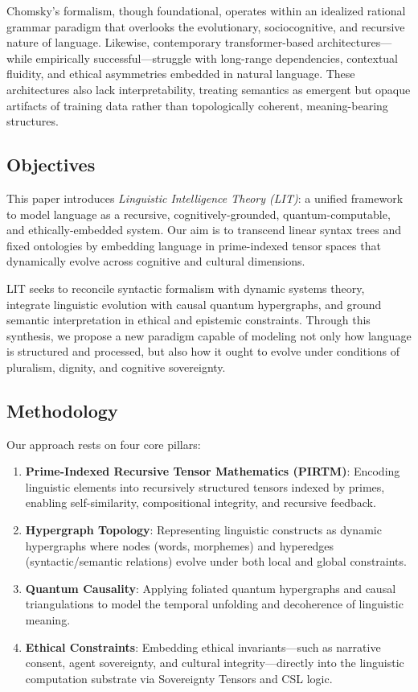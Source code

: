 \documentclass{article}
\theoremstyle{plain}
\theoremstyle{claimstyle}
\begin{document}
Chomsky’s formalism, though foundational, operates within an idealized rational grammar paradigm that overlooks the evolutionary, sociocognitive, and recursive nature of language. Likewise, contemporary transformer-based architectures—while empirically successful—struggle with long-range dependencies, contextual fluidity, and ethical asymmetries embedded in natural language. These architectures also lack interpretability, treating semantics as emergent but opaque artifacts of training data rather than topologically coherent, meaning-bearing structures.

\subsection{Objectives}

This paper introduces \textit{Linguistic Intelligence Theory (LIT)}: a unified framework to model language as a recursive, cognitively-grounded, quantum-computable, and ethically-embedded system. Our aim is to transcend linear syntax trees and fixed ontologies by embedding language in prime-indexed tensor spaces that dynamically evolve across cognitive and cultural dimensions. 

LIT seeks to reconcile syntactic formalism with dynamic systems theory, integrate linguistic evolution with causal quantum hypergraphs, and ground semantic interpretation in ethical and epistemic constraints. Through this synthesis, we propose a new paradigm capable of modeling not only how language is structured and processed, but also how it ought to evolve under conditions of pluralism, dignity, and cognitive sovereignty.

\subsection{Methodology}

Our approach rests on four core pillars:

\begin{enumerate}
    \item \textbf{Prime-Indexed Recursive Tensor Mathematics (PIRTM)}: Encoding linguistic elements into recursively structured tensors indexed by primes, enabling self-similarity, compositional integrity, and recursive feedback.
    \item \textbf{Hypergraph Topology}: Representing linguistic constructs as dynamic hypergraphs where nodes (words, morphemes) and hyperedges (syntactic/semantic relations) evolve under both local and global constraints.
    \item \textbf{Quantum Causality}: Applying foliated quantum hypergraphs and causal triangulations to model the temporal unfolding and decoherence of linguistic meaning.
    \item \textbf{Ethical Constraints}: Embedding ethical invariants—such as narrative consent, agent sovereignty, and cultural integrity—directly into the linguistic computation substrate via Sovereignty Tensors and CSL logic.
\end{enumerate}
\end{document}
